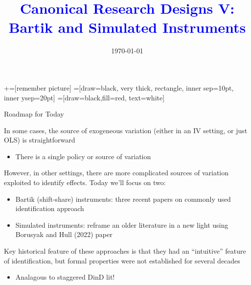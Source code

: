 \documentclass[notes,11pt, aspectratio=169]{beamer}
\title[]{\textcolor{blue}{Canonical Research Designs V:\\ Bartik and Simulated Instruments }}
\author[PGP]{}
\institute[FRBNY]{\small{\begin{tabular}{c}
  Paul Goldsmith-Pinkham  \\
\end{tabular}}}
\date{\today}
\newenvironment{wideitemize}{\itemize\addtolength{\itemsep}{10pt}}{\enditemize}
\begin{document}
\newcommand\marktopleft[1]{%
    \tikz[overlay,remember picture] 
        \node (marker-#1-a) at (-.3em,.3em) {};%
}
\newcommand\markbottomright[2]{%
    \tikz[overlay,remember picture] 
        \node (marker-#1-b) at (0em,0em) {};%
}
+=[remember picture] 
 =[draw=black, very thick, rectangle, inner sep=10pt, inner ysep=20pt]
 =[draw=black,fill=red, text=white]

\begin{frame}
\maketitle
\end{frame}

\begin{frame}{Roadmap for Today}
  \begin{wideitemize}
  \item In some cases, the source of exogeneous variation (either in an IV setting, or just OLS) is straightforward
    \begin{itemize}
    \item There is a single policy or source of variation
    \end{itemize}
  \item However, in other settings, there are more complicated sources of variation exploited to identify effects. Today we'll focus on two:
    \begin{itemize}
    \item Bartik (shift-share) instruments: three recent
      papers on commonly used identification approach
    \item Simulated instruments: reframe an older literature in a new
      light using Borusyak and Hull (2022) paper
    \end{itemize}
  \item Key historical feature of these approaches is that they had an ``intuitive'' feature of identification, but formal properties were not established for several decades
    \begin{itemize}
    \item Analagous to staggered DinD lit!
    \end{itemize}
  \end{wideitemize}
\end{frame}
\end{document}

